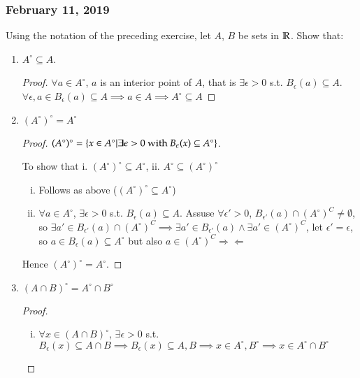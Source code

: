 \subsubsection*{February 11, 2019}

 Using the notation of the preceding exercise, let $A$, $B$ be sets in $\mathbb{R}$. Show that:

\begin{enumerate}
  \item $A^\circ \subseteq A$.

  \begin{proof}
    $\forall a\in A^\circ$, $a$ is an interior point of $A$, that is $\exists \epsilon > 0$ s.t. $B_\epsilon (a) \subseteq A$. $\forall \epsilon, a\in B_\epsilon (a)\subseteq A\implies a\in A\implies A^\circ \subseteq A$
  \end{proof}

  \item $(A^\circ)^\circ=A^\circ$

  \begin{proof}
    $(A^\circ)^\circ = \left\{ x\in A^\circ | \exists\epsilon > 0\text{ with }B_\epsilon (x) \subseteq A^\circ \right\}$.

    To show that i. $(A^\circ)^\circ\subseteq A^\circ$, ii. $A^\circ\subseteq (A^\circ)^\circ$

    \begin{enumerate}[i.]
      \item Follows as above ($(A^\circ)^\circ\subseteq A^\circ$)

      \item $\forall a\in A^\circ$, $\exists \epsilon > 0$ s.t. $B_\epsilon (a)\subseteq A$. Assuse $\forall \epsilon' > 0$, $B_{\epsilon'}(a)\cap (A^\circ)^C \neq \emptyset$, so $\exists a' \in B_{\epsilon'}(a)\cap (A^\circ)^C\implies \exists a' \in B_{\epsilon'}(a) \land \exists a' \in (A^\circ)^C$, let $\epsilon' = \epsilon$, so $a\in B_{\epsilon}(a)\subseteq A^\circ$ but also $a\in (A^\circ)^C \Rightarrow\!\Leftarrow$
    \end{enumerate}
    Hence $(A^\circ)^\circ=A^\circ$.
  \end{proof}

  \item $(A \cap B)^\circ = A^\circ \cap B^\circ$

  \begin{proof}
    \begin{enumerate}[i.]
      \item $\forall x \in (A \cap B)^\circ$, $\exists\epsilon > 0$ s.t. $B_\epsilon (x)\subseteq A\cap B\implies B_\epsilon (x)\subseteq A, B\implies x\in A^\circ, B^\circ\implies x\in A^\circ \cap B^\circ$


\end{enumerate}
\end{proof}
\end{enumerate}
